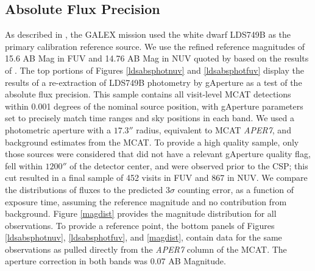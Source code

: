 \documentclass[preprint]{aastex}
\begin{document}
\subsection{Absolute Flux Precision}
As described in \citet{mor2007}, the GALEX mission used the white dwarf LDS749B as the primary calibration reference source. We use the refined reference magnitudes of 15.6 AB Mag in FUV and 14.76 AB Mag in NUV quoted by \cite{camarota2014white} based on the results of \cite{bohlin2008absolute}. The top portions of Figures \ref{ldsabsphotnuv} and \ref{ldsabsphotfuv} display the results of a re-extraction of LDS749B photometry by gAperture as a test of the absolute flux precision. This sample contains all visit-level MCAT detections within 0.001 degrees of the nominal source position, with gAperture parameters set to precisely match time ranges and sky positions in each band. We used a photometric aperture with a $17.3''$ radius, equivalent to MCAT \emph{APER7}, and background estimates from the MCAT. To provide a high quality sample, only those sources were considered that did not have a relevant gAperture quality flag, fell within $1200''$ of the detector center, and were observed prior to the CSP; this cut resulted in a final sample of 452 visits in FUV and 867 in NUV. We compare the distributions of fluxes to the predicted 3$\sigma$ counting error, as a function of exposure time, assuming the reference magnitude and no contribution from background. Figure \ref{magdist} provides the magnitude distribution for all observations. To provide a reference point, the bottom panels of Figures \ref{ldsabsphotnuv}, \ref{ldsabsphotfuv}, and \ref{magdist}, contain data for the same observations as pulled directly from the \emph{APER7} column of the MCAT. The aperture correction in both bands was 0.07 AB Magnitude.
\end{document}
